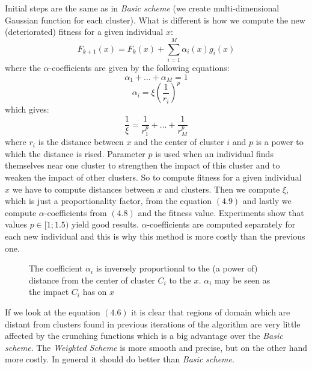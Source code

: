 Initial steps are the same as in \textit{Basic scheme} (we create 
multi-dimensional Gaussian function for each cluster). What is different
is how we compute the new (deteriorated) fitness for a given individual $x$:
\begin{equation}
F_{k+1}(x)=F_k(x) + \sum_{i=1}^M \alpha_i(x) g_i(x)
\end{equation}
where the $\alpha$-coefficients are given by the following equations:
\begin{equation}
	\alpha_1 + \ldots + \alpha_M = 1
\end{equation}
\begin{equation}
	\alpha_i = \xi(\frac{1}{r_i})^p
\end{equation}
which gives:
\begin{equation}
\frac{1}{\xi}=\frac{1}{r_1^p} + \ldots + \frac{1}{r_M^p}
\end{equation}
where $r_i$ is the distance between $x$ and the center of cluster $i$ and $p$
is a power to which the distance is rised. Parameter $p$ is used when an
individual finds themselves near one cluster to strengthen the impact of this
cluster and to weaken the impact of other clusters. So to compute fitness for a 
given individual $x$ we have to compute distances between $x$ and clusters. 
Then we compute $\xi$, which is just a proportionality
factor, from the equation $(4.9)$ and lastly we compute $\alpha$-coefficients
from $(4.8)$ and the fitness value. Experiments show that values $p \in [1;1.5)$
yield good results. $\alpha$-coefficients are computed separately for each new 
individual and this is why this method is more costly than the previous one.
\begin{figure}
  \centering
  \caption{The coefficient $\alpha_i$ is inversely proportional to the (a power
  of) distance from the center of cluster $C_i$ to the $x$. $\alpha_i$ may
  be seen as the impact $C_i$ has on $x$}
  \label{weightedScheme}
\end{figure}

If we look at the equation $(4.6)$ it is clear that regions of domain
which are distant from clusters found in previous iterations of the algorithm
are very little affected by the crunching functions which is a big advantage
over the \textit{Basic scheme}. 
The \textit{Weighted Scheme} is more smooth and precise, but on the other hand
more costly. In general it should do better than \textit{Basic scheme}.

